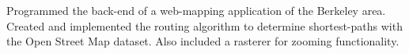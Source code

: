 \documentclass[]{deedy-resume-openfont}
\begin{document}
\begin{minipage}[t]{0.66\textwidth}
\begin{comment}
\runsubsection{Shape from Stereo}
\descript{| C}
Created a program that produces a displacement map of an image given two input images. Simulates depth perception by comparing the differences between the two images. Also implemented quadtree compression for bitmap images.
\end{comment}

Programmed the back-end of a web-mapping application of the Berkeley area. Created and implemented the routing algorithm to determine shortest-paths with the Open Street Map dataset. Also included a rasterer for zooming functionality. 
\sectionsep


\begin{comment}

\section{Awards} 
\begin{tabular}{rll}
2014	     & top 52/2500  & KPCB Engineering Fellow\\
2014	     & 1\textsuperscript{st}/50  & Microsoft Coding Competition, Cornell\\
2013	     & National  & Jump Trading Challenge Finalist\\
2013     & 7\textsuperscript{th}/120 & CS 3410 Cache Race Bot Tournament  \\
2012     & 2\textsuperscript{nd}/150 & CS 3110 Biannual Intra-Class Bot Tournament \\
2011     & National & Indian National Mathematics Olympiad (INMO) Finalist \\
\end{tabular}
\sectionsep
\end{comment}

\end{minipage} 
\end{document}
